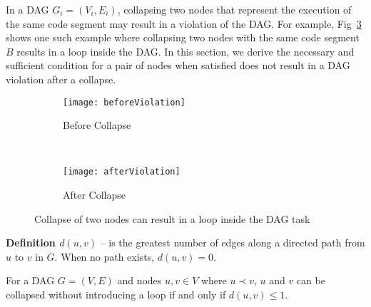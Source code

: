 In a DAG ${G_i = (V_i, E_i)}$, collapsing two nodes that represent the
execution of the same code segment may result in a violation of the
DAG. For example, Fig~\ref{fig:dag-violation} shows one such example
where collapsing two nodes with the same code segment $B$ results in a
loop inside the DAG. In this section, we derive the necessary and
sufficient condition for a pair of nodes when satisfied does not
result in a DAG violation after a collapse.


\begin{figure}
  \centering
  \begin{subfigure}[b]{0.48\textwidth}{
      \texttt{[image: beforeViolation]}
      \caption{Before Collapse}
      \label{fig:beforeViolation}
    }
  \end{subfigure}~
  \begin{subfigure}[b]{0.33\textwidth}{
      \texttt{[image: afterViolation]}
      \caption{After Collapse}
      \label{fig:afterViolation}
    }
  \end{subfigure}
  \caption{Collapse of two nodes can result in a loop inside the DAG task}
  \label{fig:dag-violation}
\end{figure}


\textbf{Definition ${d(u, v)}$} -- is the greatest number of edges
along a directed path from ${u}$ to ${v}$ in ${G}$. When no path
exists, ${d(u,v) = 0}$.

\begin{theorem}
  For a DAG ${G = (V, E)}$ and nodes ${u, v \in V}$ where ${u \prec
    v}$, ${u}$ and ${v}$ can be collapsed without introducing a loop
  if and  only if ${d(u, v) \le 1}$.
\end{theorem}


